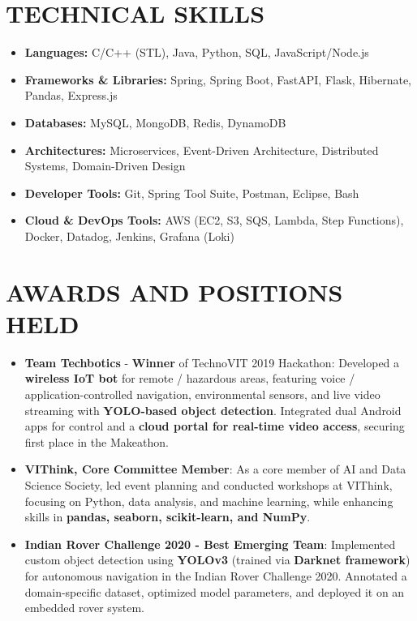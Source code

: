 \documentclass[letterpaper,11pt]{article}
\newcommand{\resumeItem}[1]{
  \item\small{
    {#1 \vspace{-2pt}}
  }
}
\newcommand{\resumeSubItem}[2]{\resumeItem{#1: #2}\vspace{-4pt}}
\newcommand{\resumeSubHeadingListStart}{\begin{itemize}[leftmargin=*]}
\newcommand{\resumeSubHeadingListEnd}{\end{itemize}}
\begin{document}
\section{TECHNICAL SKILLS}
  \resumeSubHeadingListStart
    \item{
      \textbf{Languages: }{C/C++ (STL), Java, Python, SQL, JavaScript/Node.js}
    }
    \item{
      \textbf{Frameworks \& Libraries: }{Spring, Spring Boot, FastAPI, Flask, Hibernate, Pandas, Express.js}
    }
    \item{
      \textbf{Databases: }{MySQL, MongoDB, Redis, DynamoDB}
    }
    \item{
      \textbf{Architectures: }{Microservices, Event-Driven Architecture, Distributed Systems, Domain-Driven Design}
    }
    \item{
      \textbf{Developer Tools: }{Git, Spring Tool Suite, Postman, Eclipse, Bash}
    }
    \item{
      \textbf{Cloud \& DevOps Tools: }{AWS (EC2, S3, SQS, Lambda, Step Functions), Docker, Datadog, Jenkins, Grafana (Loki)}
    }
  \resumeSubHeadingListEnd


\section{AWARDS AND POSITIONS HELD}
  \resumeSubHeadingListStart
    \resumeSubItem{\textbf{Team Techbotics} - \textbf{Winner} of TechnoVIT 2019 Hackathon}{Developed a \textbf{wireless IoT bot} for remote / hazardous areas, featuring voice / application-controlled navigation, environmental sensors, and live video streaming with \textbf{YOLO-based object detection}. Integrated dual Android apps for control and a \textbf{cloud portal for real-time video access}, securing first place in the Makeathon.}
    \\[1em]
     \resumeSubItem{\textbf{VIThink, Core Committee Member}}{As a core member of AI and Data Science Society, led event planning and conducted workshops at VIThink, focusing on Python, data analysis, and machine learning, while enhancing skills in \textbf{pandas, seaborn, scikit-learn, and NumPy}.} 
     \\[1em]
    \resumeSubItem{\textbf{Indian Rover Challenge 2020 - Best Emerging Team}}{Implemented custom object detection using \textbf{YOLOv3} (trained via \textbf{Darknet framework}) for autonomous navigation in the Indian Rover Challenge 2020. Annotated a domain-specific dataset, optimized model parameters, and deployed it on an embedded rover system.}
  \resumeSubHeadingListEnd
\end{document}
